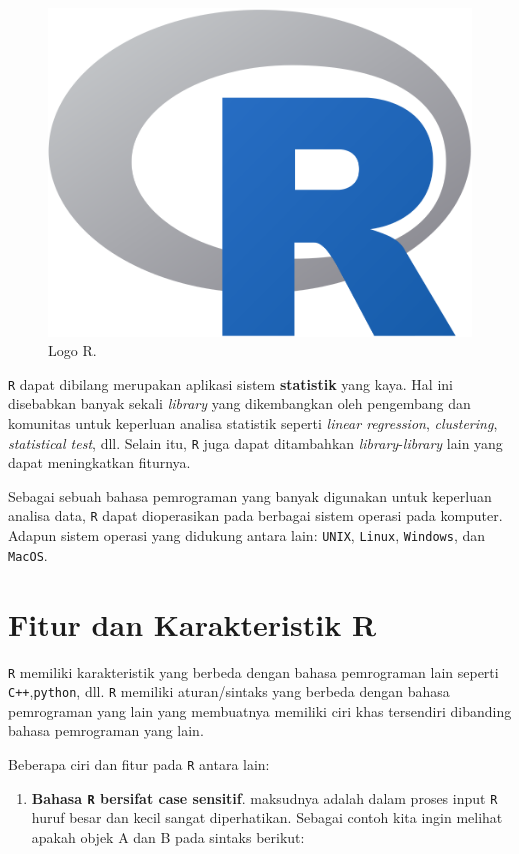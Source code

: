 \documentclass[]{book}
\providecommand{\tightlist}{%
  \setlength{\itemsep}{0pt}\setlength{\parskip}{0pt}}
\theoremstyle{definition}
\theoremstyle{definition}
\theoremstyle{definition}
\theoremstyle{remark}
\begin{document}
\begin{figure}

{\centering \includegraphics[width=0.4\linewidth]{./images/r-icon} 

}

\caption{Logo R.}\label{fig:Logo}
\end{figure}

\texttt{R} dapat dibilang merupakan aplikasi sistem \textbf{statistik} yang kaya. Hal ini disebabkan banyak sekali \emph{library} yang dikembangkan oleh pengembang dan komunitas untuk keperluan analisa statistik seperti \emph{linear regression}, \emph{clustering}, \emph{statistical test}, dll. Selain itu, \texttt{R} juga dapat ditambahkan \emph{library}-\emph{library} lain yang dapat meningkatkan fiturnya.

Sebagai sebuah bahasa pemrograman yang banyak digunakan untuk keperluan analisa data, \texttt{R} dapat dioperasikan pada berbagai sistem operasi pada komputer. Adapun sistem operasi yang didukung antara lain: \texttt{UNIX}, \texttt{Linux}, \texttt{Windows}, dan \texttt{MacOS}.

\hypertarget{fiturR}{%
\section{Fitur dan Karakteristik R}\label{fiturR}}

\texttt{R} memiliki karakteristik yang berbeda dengan bahasa pemrograman lain seperti \texttt{C++},\texttt{python}, dll. \texttt{R} memiliki aturan/sintaks yang berbeda dengan bahasa pemrograman yang lain yang membuatnya memiliki ciri khas tersendiri dibanding bahasa pemrograman yang lain.

Beberapa ciri dan fitur pada \texttt{R} antara lain:

\begin{enumerate}
\def\labelenumi{\arabic{enumi}.}
\tightlist
\item
  \textbf{Bahasa \texttt{R} bersifat case sensitif}. maksudnya adalah dalam proses input \texttt{R} huruf besar dan kecil sangat diperhatikan. Sebagai contoh kita ingin melihat apakah objek A dan B pada sintaks berikut:
\end{enumerate}
\end{document}
